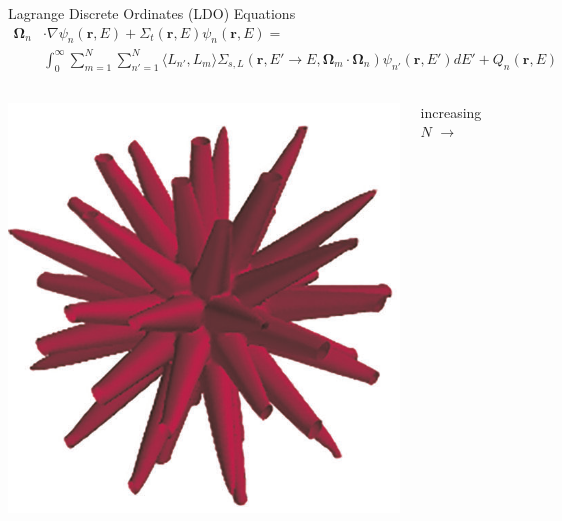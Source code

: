 \documentclass{beamer}
\newcommand{\bo}{\mathbf\Omega}
\newcommand{\vecr}{\textbf{r}}
\begin{document}
\begin{frame}{Lagrange Discrete Ordinates (LDO) Equations \nocite{ahrens}}
%
\vspace{-2em}
%
\begin{align*}
\bo_n&\cdot\nabla\psi_{n}(\vecr,E) + 
\Sigma_{t}(\vecr,E)\psi_{n}(\vecr,E) = \\
&\int_0^\infty\sum_{m=1}^{N}\sum_{n'=1}^{N}\langle L_{n'},L_{m}\rangle
\Sigma_{s,L}(\vecr,E'\rightarrow E,\bo_{m}\cdot\bo_n)\psi_{n'}(\vecr,E')dE'
+ Q_{n}(\vecr,E)
\end{align*}
%
\pause
%
\begin{columns}
\begin{column}{0.4\textwidth}
\includegraphics[width=\textwidth,natwidth=573,natheight=601]{img/ray-effects-ldo.png}
\end{column}
\pause
\begin{column}{0.2\textwidth}
\center\large increasing $N$
\vspace{-1.5em}
\center\Huge$\rightarrow$
\end{column}
\begin{column}{0.4\textwidth}

\end{column}
\end{columns}
\end{frame}
\end{document}

